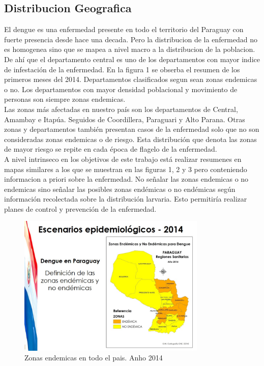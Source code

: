 \subsection{Distribucion Geografica}

El dengue es una enfermedad presente en todo el territorio del Paraguay con fuerte presencia desde hace una decada. Pero la distribucion de la enfermedad no es homogenea sino que se mapea a nivel macro a la distribucion de la poblacion. De ahí que el departamento central es uno de los departamentos con mayor indice de infestación de la enfermedad. En la figura 1 se obserba el resumen de los primeros meses del 2014. Departamentos clasificados segun sean zonas endemicas o no. Los departamentos con mayor densidad poblacional y movimiento de personas son siempre zonas endemicas.\\

Las zonas más afectadas en nuestro país son los departamentos de Central, Amambay e Itapúa. Seguidos de Coordillera, Paraguari y Alto Parana. Otras zonas y departamentos también presentan casos de la enfermedad solo que no son consideradas zonas endemicas o de riesgo. Esta distribución que denota las zonas de mayor riesgo se repite en cada época de flagelo de la enfermedad.\\

A nivel intrinseco en los objetivos de este trabajo está realizar resumenes en mapas similares a los que se muestran en las figuras 1, 2 y 3 pero conteniendo informacion a priori sobre la enfermedad. No señalar las zonas endemicas o no endemicas sino señalar las posibles zonas endémicas o no endémicas según información recolectada sobre la distribución larvaria. Esto permitiría realizar planes de control y prevención de la enfermedad.\\

\begin{figure}
\centering
\includegraphics[width=0.8\textwidth]{./graphics/Diapositiva03.JPG}
\caption{\label{fig:mapa1}Zonas endemicas en todo el pais. Anho 2014}
\end{figure}

